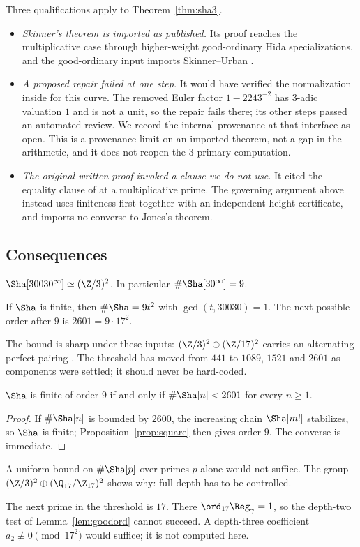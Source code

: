 \begin{remark}[Provenance at $3$]\label{rem:su}
Three qualifications apply to Theorem~\ref{thm:sha3}.
\begin{itemize}[leftmargin=*]
\item \emph{Skinner's theorem is imported as published.} Its proof reaches the multiplicative case through higher-weight good-ordinary Hida specializations, and the good-ordinary input imports Skinner--Urban \cite{su}.
\item \emph{A proposed repair failed at one step.} It would have verified the normalization inside \cite[Prop.~12.3.6]{su} for this curve. The removed Euler factor $1-2243^{-2}$ has $3$-adic valuation $1$ and is not a unit, so the repair fails there; its other steps passed an automated review. We record the internal provenance at that interface as open. This is a provenance limit on an imported theorem, not a gap in the arithmetic, and it does not reopen the $3$-primary computation.
\item \emph{The original written proof invoked a clause we do not use.} It cited the equality clause of \cite[Thm.~6.1]{sw} at a multiplicative prime. The governing argument above instead uses finiteness first together with an independent height certificate, and imports no converse to Jones's theorem.
\end{itemize}
\end{remark}

\subsection{Consequences}
\begin{corollary}[\cid{S.P}]\label{cor:small}
$\Sha[30030^\infty]\simeq(\Z/3)^2$. In particular $\#\Sha[30^\infty]=9$.
\end{corollary}

\begin{proposition}\label{prop:square}
If $\Sha$ is finite, then $\#\Sha=9t^2$ with $\gcd(t,30030)=1$. The next possible order after $9$ is $2601=9\cdot17^2$.
\end{proposition}
The bound is sharp under these inputs: $(\Z/3)^2\oplus(\Z/17)^2$ carries an alternating perfect pairing \cite{poonenstoll}. The threshold has moved from $441$ to $1089$, $1521$ and $2601$ as components were settled; it should never be hard-coded.

\begin{proposition}\label{prop:uniform}
$\Sha$ is finite of order $9$ if and only if $\#\Sha[n]<2601$ for every $n\ge1$.
\end{proposition}
\begin{proof}
If $\#\Sha[n]$ is bounded by $2600$, the increasing chain $\Sha[m!]$ stabilizes, so $\Sha$ is finite; Proposition~\ref{prop:square} then gives order $9$. The converse is immediate.
\end{proof}
A uniform bound on $\#\Sha[p]$ over primes $p$ alone would not suffice. The group $(\Z/3)^2\oplus(\Q_{17}/\Z_{17})^2$ shows why: full depth has to be controlled.

\begin{remark}\label{rem:17}
The next prime in the threshold is $17$. There $\ord_{17}\Reg_\gamma=1$, so the depth-two test of Lemma~\ref{lem:goodord} cannot succeed. A depth-three coefficient $a_2\not\equiv0\pmod{17^2}$ would suffice; it is not computed here.
\end{remark}
